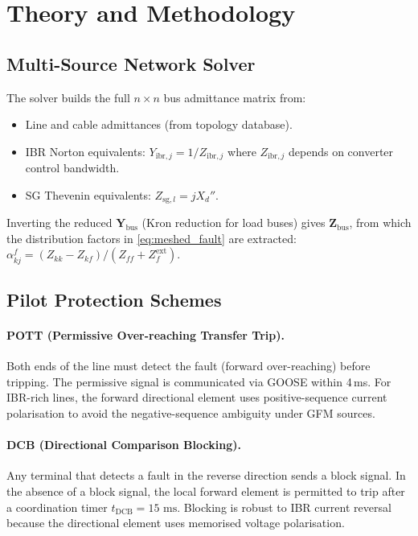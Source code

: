 \documentclass[11pt, a4paper]{article}
\newcommand{\ms}{\,\text{ms}}
\begin{document}
\section{Theory and Methodology}
\label{sec:theory}

\subsection{Multi-Source Network Solver}

The solver builds the full $n \times n$ bus admittance matrix from:
\begin{itemize}
  \item Line and cable admittances (from topology database).
  \item IBR Norton equivalents: $Y_{\mathrm{ibr},j} = 1/Z_{\mathrm{ibr},j}$
    where $Z_{\mathrm{ibr},j}$ depends on converter control bandwidth.
  \item SG Thevenin equivalents: $Z_{\mathrm{sg},l} = j X_d''$.
\end{itemize}

Inverting the reduced $\mathbf{Y}_{\mathrm{bus}}$ (Kron reduction for load buses)
gives $\mathbf{Z}_{\mathrm{bus}}$, from which the distribution factors in
\eqref{eq:meshed_fault} are extracted:
$\alpha_{kj}^f = (Z_{kk} - Z_{kf}) / (Z_{ff} + Z_f^{\mathrm{ext}})$.

\subsection{Pilot Protection Schemes}

\paragraph{POTT (Permissive Over-reaching Transfer Trip).}
Both ends of the line must detect the fault (forward over-reaching) before
tripping. The permissive signal is communicated via GOOSE within 4\,ms.
For IBR-rich lines, the forward directional element uses positive-sequence
current polarisation to avoid the negative-sequence ambiguity under GFM
sources.

\paragraph{DCB (Directional Comparison Blocking).}
Any terminal that detects a fault in the reverse direction sends a block signal.
In the absence of a block signal, the local forward element is permitted to
trip after a coordination timer $t_{\mathrm{DCB}} = 15\,\ms$. Blocking is
robust to IBR current reversal because the directional element uses memorised
voltage polarisation.
\end{document}
